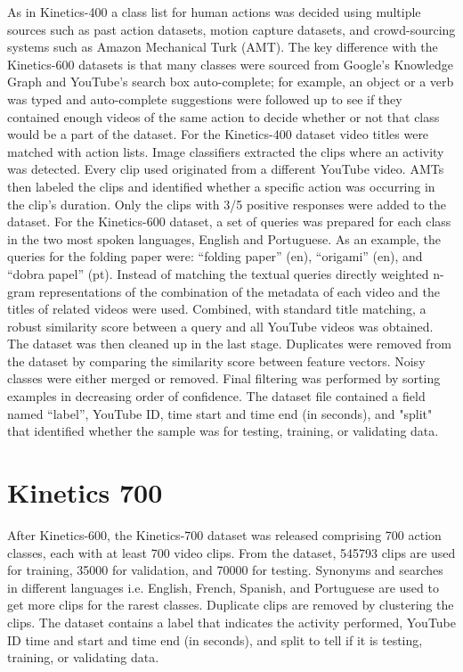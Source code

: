  As in Kinetics-400 a class list for human actions was decided using multiple sources such as past action datasets, motion capture datasets, and crowd-sourcing systems such as Amazon Mechanical Turk (AMT). The key difference with the Kinetics-600 datasets is that many classes were sourced from Google’s Knowledge Graph and YouTube’s search box auto-complete; for example, an object or a verb was typed and auto-complete suggestions were followed up to see if they contained enough videos of the same action to decide whether or not that class would be a part of the dataset. For the Kinetics-400 dataset video titles were matched with action lists. Image classifiers extracted the clips where an activity was detected. Every clip used originated from a different YouTube video. AMTs then labeled the clips and identified whether a specific action was occurring in the clip's duration. Only the clips with 3/5 positive responses were added to the dataset. For the Kinetics-600 dataset, a set of queries was prepared for each class in the two most spoken languages, English and Portuguese. As an example, the queries for the folding paper were: “folding paper” (en), “origami” (en), and “dobra papel” (pt). Instead of matching the textual queries directly weighted n-gram representations of the combination of the metadata of each video and the titles of related videos were used. Combined, with standard title matching, a robust similarity score between a query and all YouTube videos was obtained.
The dataset was then cleaned up in the last stage. Duplicates were removed from the dataset by comparing the similarity score between feature vectors. Noisy classes were either merged or removed. Final filtering was performed by sorting examples in decreasing order of confidence. The dataset file contained a field named “label”, YouTube ID, time start and time end (in seconds), and "split" that identified whether the sample was for testing, training, or validating data.
\section{Kinetics 700}
After Kinetics-600, the Kinetics-700 \cite{kinetics-700} dataset was released comprising 700 action classes, each with at least 700 video clips. From the dataset, 545793 clips are used for training, 35000 for validation, and 70000 for testing.  Synonyms and searches in different languages i.e. English, French, Spanish, and Portuguese are used to get more clips for the rarest classes. Duplicate clips are removed by clustering the clips. The dataset contains a label that indicates the activity performed, YouTube ID time and start and time end (in seconds), and split to tell if it is testing, training, or validating data.  
